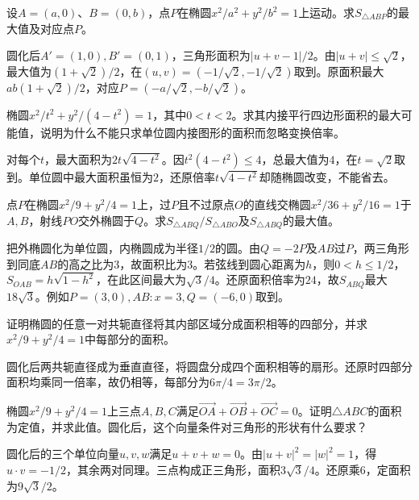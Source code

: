 设\(A=(a,0)\)、\(B=(0,b)\)，点\(P\)在椭圆\(x^2/a^2+y^2/b^2=1\)上运动。求\(S_{\triangle ABP}\)的最大值及对应点\(P\)。
\par
\solutionanswer
圆化后\(A'=(1,0),B'=(0,1)\)，三角形面积为\(|u+v-1|/2\)。由\(|u+v|\le\sqrt2\)，最大值为\((1+\sqrt2)/2\)，在\((u,v)=(-1/\sqrt2,-1/\sqrt2)\)取到。原面积最大\(ab(1+\sqrt2)/2\)，对应\(P=(-a/\sqrt2,-b/\sqrt2)\)。


椭圆\(x^2/t^2+y^2/(4-t^2)=1\)，其中\(0<t<2\)。求其内接平行四边形面积的最大可能值，说明为什么不能只求单位圆内接图形的面积而忽略变换倍率。
\par
\solutionanswer
对每个\(t\)，最大面积为\(2t\sqrt{4-t^2}\)。因\(t^2(4-t^2)\le4\)，总最大值为\(4\)，在\(t=\sqrt2\)取到。单位圆中最大面积虽恒为\(2\)，还原倍率\(t\sqrt{4-t^2}\)却随椭圆改变，不能省去。


点\(P\)在椭圆\(x^2/9+y^2/4=1\)上，过\(P\)且不过原点\(O\)的直线交椭圆\(x^2/36+y^2/16=1\)于\(A,B\)，射线\(PO\)交外椭圆于\(Q\)。求\(S_{\triangle ABQ}/S_{\triangle ABO}\)及\(S_{\triangle ABQ}\)的最大值。
\par
\solutionanswer
把外椭圆化为单位圆，内椭圆成为半径\(1/2\)的圆。由\(Q=-2P\)及\(AB\)过\(P\)，两三角形到同底\(AB\)的高之比为\(3\)，故面积比为\(3\)。若弦线到圆心距离为\(h\)，则\(0<h\le1/2\)，\(S_{OAB}=h\sqrt{1-h^2}\)，在此区间最大为\(\sqrt3/4\)。还原面积倍率为\(24\)，故\(S_{ABQ}\)最大\(18\sqrt3\)。例如\(P=(3,0),AB:x=3,Q=(-6,0)\)取到。


证明椭圆的任意一对共轭直径将其内部区域分成面积相等的四部分，并求\(x^2/9+y^2/4=1\)中每部分的面积。
\par
\solutionanswer
圆化后两共轭直径成为垂直直径，将圆盘分成四个面积相等的扇形。还原时四部分面积均乘同一倍率，故仍相等，每部分为\(6\pi/4=3\pi/2\)。


椭圆\(x^2/9+y^2/4=1\)上三点\(A,B,C\)满足\(\overrightarrow{OA}+\overrightarrow{OB}+\overrightarrow{OC}=0\)。证明\(\triangle ABC\)的面积为定值，并求此值。圆化后，这个向量条件对三角形的形状有什么要求？
\par
\solutionanswer
圆化后的三个单位向量\(u,v,w\)满足\(u+v+w=0\)。由\(|u+v|^2=|w|^2=1\)，得\(u\cdot v=-1/2\)，其余两对同理。三点构成正三角形，面积\(3\sqrt3/4\)。还原乘\(6\)，定面积为\(9\sqrt3/2\)。


